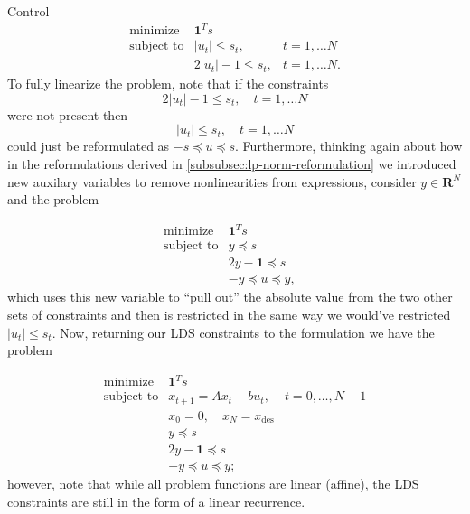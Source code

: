 \begin{chapter}{Control}
    \[\begin{array}{lll}
    \text{minimize} \; & \bm{1}^T s & \\
    \text{subject to} & \left| u_t \right| \le s_t, & t = 1, \ldots N \\
    & 2 \left| u_t \right| - 1 \le s_t, & t = 1, \ldots N.
    \end{array}\]
    To fully linearize the problem, note that if the constraints
    \[ 2 \left| u_t \right| - 1 \le s_t, \quad t = 1, \ldots N\]
    were not present then 
    \[\left| u_t \right| \le s_t, \quad t = 1, \ldots N\]
    could just be reformulated as 
    $-s \preceq u \preceq s$.
    Furthermore, thinking again about how in the reformulations derived in \hyperref[subsubsec:lp-norm-reformulation]{\ref{subsubsec:lp-norm-reformulation}}
    we introduced new auxilary variables to remove nonlinearities from expressions, consider $y \in \mathbf{R}^N$ and the problem

    \[\begin{array}{lll}
    \text{minimize} \; & \bm{1}^T s & \\
    \text{subject to} & y \preceq s & \\
    & 2y - \bm{1} \preceq s \\
    & -y \preceq u \preceq y, & 
    \end{array}\]
    which uses this new variable to ``pull out'' the absolute value from the two other sets
    of constraints and then is restricted in the same way we would've restricted $\left| u_t \right| \le s_t$.
    Now, returning our LDS constraints to the formulation we have the problem

    \[\begin{array}{lll}
        \text{minimize} \; & \bm{1}^T s & \\
        \text{subject to} & x_{t+1} = Ax_t + bu_t, \; & t=0, \ldots, N-1 \\
        & x_0 = 0, \quad x_{N} = x_{\text{des}} & \\
        & y \preceq s & \\
        & 2y - \bm{1} \preceq s & \\
        & -y \preceq u \preceq y; & 
        \end{array}\]
    however, note that while all problem functions are linear (affine), the LDS constraints 
    are still in the form of a linear recurrence.
    

\end{chapter}
